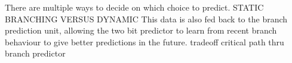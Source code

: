 There are multiple ways to decide on which choice to predict.
STATIC BRANCHING VERSUS DYNAMIC
This data is also fed back to the branch prediction unit, allowing the two bit predictor to learn from recent branch behaviour to give better predictions in the future.
tradeoff critical path thru branch predictor
